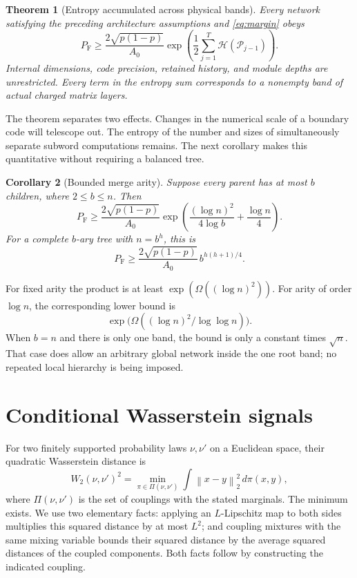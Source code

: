 \documentclass[11pt]{article}
\newtheorem{theorem}{Theorem}[section]
\newtheorem{corollary}[theorem]{Corollary}
\theoremstyle{remark}\newtheorem{remark}[theorem]{Remark}
\newcommand{\norm}[1]{\left\lVert#1\right\rVert}
\newcommand{\PF}{P_{\mathrm F}}
\newcommand{\W}{W_2}
\newcommand{\cP}{\mathcal P}
\newcommand{\ent}{\mathcal H}
\begin{document}
\begin{theorem}[Entropy accumulated across physical bands]\label{thm:entropy}
Every network satisfying the preceding architecture assumptions and
\eqref{eq:margin} obeys
\begin{equation}\label{eq:entropy-bound}
 \PF\ge\frac{2\sqrt{p(1-p)}}{A_0}
   \exp\!\left(\frac12\sum_{j=1}^T\ent(\cP_{j-1})\right).
\end{equation}
Internal dimensions, code precision, retained history, and module depths
are unrestricted. Every term in the entropy sum corresponds to a nonempty
band of actual charged matrix layers.
\end{theorem}

The theorem separates two effects. Changes in the numerical scale of a
boundary code will telescope out. The entropy of the number and sizes of
simultaneously separate subword computations remains. The next corollary
makes this quantitative without requiring a balanced tree.

\begin{corollary}[Bounded merge arity]\label{cor:arity}
Suppose every parent has at most $b$ children, where $2\le b\le n$. Then
\begin{equation}\label{eq:arity-bound}
 \PF\ge\frac{2\sqrt{p(1-p)}}{A_0}
   \exp\!\left(\frac{(\log n)^2}{4\log b}+\frac{\log n}{4}\right).
\end{equation}
For a complete $b$-ary tree with $n=b^h$, this is
\[
 \PF\ge\frac{2\sqrt{p(1-p)}}{A_0}\,b^{h(h+1)/4}.
\]
\end{corollary}

For fixed arity the product is at least $\exp(\Omega((\log n)^2))$.
For arity of order $\log n$, the corresponding lower bound is
\[
 \exp\!\bigl(\Omega((\log n)^2/\log\log n)\bigr).
\]
When $b=n$ and there is only one band, the bound is only a constant times
$\sqrt n$. That case does allow an arbitrary global network inside the one
root band; no repeated local hierarchy is being imposed.

\section{Conditional Wasserstein signals}

For two finitely supported probability laws $\nu,\nu'$ on a Euclidean
space, their quadratic Wasserstein distance is
\[
 \W(\nu,\nu')^2
   =\min_{\pi\in\Pi(\nu,\nu')}
          \int\norm{x-y}_2^2\,d\pi(x,y),
\]
where $\Pi(\nu,\nu')$ is the set of couplings with the stated marginals.
The minimum exists. We use two elementary facts: applying an $L$-Lipschitz
map to both sides multiplies this squared distance by at most $L^2$;
and coupling mixtures with the same mixing variable bounds their squared
distance by the average squared distances of the coupled components.
Both facts follow by constructing the indicated coupling.
\end{document}
